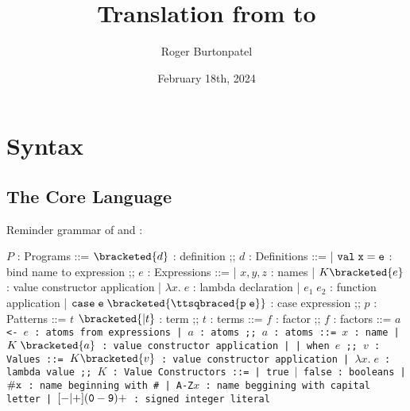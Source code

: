 \documentclass[]{article}
\title{Translation from \PPlus to \VMinus}
\author{Roger Burtonpatel}
\date{February 18th, 2024}
\begin{document}
\maketitle

\section{Syntax}

\subsection{The Core Language}

Reminder grammar of \PPlus and \VMinus: 

\bigskip

\begin{center}
    \begin{bnf}
    $P$ : \textsf{Programs} ::=
    $\bracketed{d}$ : definition
    ;;
    $d$ : \textsf{Definitions} ::=
    | $\tt{val} \; x \; \tt{=} \; e$ : bind name to expression
    ;;
    $e$ : Expressions ::= 
    | $x, y, z$ : names
    | $K\bracketed{e}$ : value constructor application 
    | $\lambda x. \; e$ : lambda declaration  
    | $e_{1} \; e_{2}$ : function application 
    | $\tt{case} \; e \; \bracketed{\ttsqbraced{p \; e}}$ : case expression 
    ;;
    $p$ : \textsf{Patterns} ::= $t$ $\bracketed{\vert t}$ : term
    ;;
    $t$ : terms ::= $f$  : factor
    ;;
    $f$ : factors ::= $a$ \tt{<-} $e$ : atoms from expressions 
        | $a$ : atoms 
    ;;
    $a$ : atoms ::= $x$ : name 
    | $K \; \bracketed{a}$ : value constructor application 
    | 
    | \tt{when} $e$
    ;;
    $v$ : Values ::= $K\bracketed{v}$ : value constructor application 
    | $\lambda x. \; e$ : lambda value 
    ;;
    $K$ : \textsf{Value Constructors} ::=
    | \tt{true} $\vert$ \tt{false} : booleans
    | $\tt{\#}x$ : name beginning with \tt{\#}
    | \tt{A-Z}$x$ : name beggining with capital letter
    | $[\tt{-}\vert\tt{+}](\tt{0}-\tt{9})+$ : signed integer literal 
    \end{bnf}
\end{center}

\bigskip 
\end{document}
